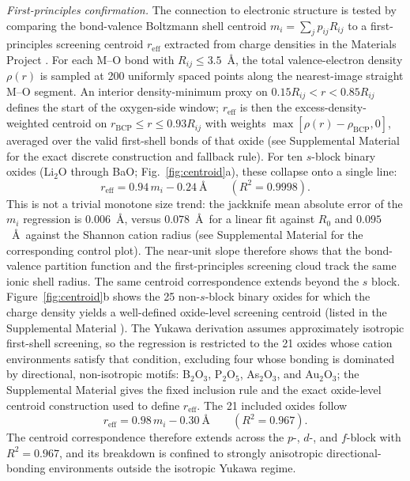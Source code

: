 \documentclass[aps,prl,twocolumn,10pt,superscriptaddress,floatfix]{revtex4-2}
\begin{document}
\emph{First-principles confirmation.} The connection to electronic structure is tested
by comparing the bond-valence Boltzmann shell centroid
$m_i=\sum_j p_{ij}R_{ij}$ to a first-principles screening centroid
$r_{\mathrm{eff}}$ extracted from charge densities in the
Materials Project \cite{MaterialsProject,Horton2025}.  For each M--O
bond with $R_{ij}\le 3.5$~\AA, the total valence-electron density
$\rho(r)$ is sampled at 200 uniformly spaced points along the
nearest-image straight M--O segment.  An interior density-minimum proxy
on $0.15R_{ij}<r<0.85R_{ij}$ defines the start of the oxygen-side
window; $r_{\mathrm{eff}}$ is then the excess-density-weighted centroid
on $r_{\mathrm{BCP}}\le r\le 0.93R_{ij}$ with weights
$\max[\rho(r)-\rho_{\mathrm{BCP}},0]$, averaged over the valid
first-shell bonds of that oxide (see Supplemental Material for the exact
discrete construction and fallback rule).
For ten $s$-block binary oxides (Li$_2$O through BaO;
Fig.~\ref{fig:centroid}a),
these collapse onto a single line:
\begin{equation*}
r_{\mathrm{eff}} = 0.94\,m_i - 0.24~\text{\AA}
\qquad (R^2=0.9998).
\end{equation*}
This is not a trivial monotone size trend: the jackknife
mean absolute error of the $m_i$ regression is $0.006$~\AA, versus
$0.078$~\AA\ for a linear fit against $R_0$ and $0.095$~\AA\ against the
Shannon cation radius
\cite{Shannon1976}
(see Supplemental Material for the corresponding control plot).  The near-unit slope therefore shows
that the bond-valence partition function and the first-principles screening cloud track
the same ionic shell radius.  The same centroid correspondence extends
beyond the $s$ block.
Figure~\ref{fig:centroid}b shows the 25 non-$s$-block binary oxides for
which the charge density yields a well-defined oxide-level screening centroid
(listed in the Supplemental Material \cite{suppmat}).  The Yukawa
derivation assumes approximately isotropic first-shell screening, so
the regression is restricted to the 21 oxides whose cation environments
satisfy that condition, excluding four whose bonding is dominated by
directional, non-isotropic motifs: B$_2$O$_3$, P$_2$O$_5$,
As$_2$O$_3$, and Au$_2$O$_3$; the Supplemental Material gives the fixed
inclusion rule and the exact oxide-level centroid construction used to
define $r_{\mathrm{eff}}$.  The 21 included oxides follow
\begin{equation*}
r_{\mathrm{eff}} = 0.98\,m_i - 0.30~\text{\AA}
\qquad (R^2=0.967).
\end{equation*}
The centroid correspondence therefore extends across the $p$-, 
$d$-, and $f$-block with $R^2=0.967$, and its breakdown is confined to
strongly anisotropic directional-bonding environments outside the isotropic Yukawa regime.
\end{document}
